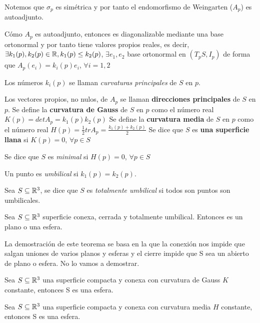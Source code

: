 Notemos que $\sigma_p$ es simétrica y por tanto el endomorfismo de Weingarten ($A_p$) es autoadjunto.

Cómo $A_p$ es autoadjunto, entonces es diagonalizable mediante una base ortonormal y por tanto tiene valores propios reales, es decir, $\exists k_1(p), k_2(p) \in \mathbb{R}, k_1(p) \leq k_2(p)$, $\exists {e_1,e_2}$ base ortonormal en $(T_pS, I_p)$ de forma que $A_p(e_i) = k_i(p)e_i$, $\forall i = 1,2$

\begin{definition}
Los números $k_i(p)$ se llaman \textit{curvaturas principales} de $S$ en $p$.
\end{definition}
Los vectores propios, no nulos, de $A_p$ se llaman \textbf{direcciones principales} de $S$ en $p$.
Se define la \textbf{curvatura de Gauss} de $S$ en $p$ como el número real $K(p)=det A_p=k_1(p)k_2(p)$
Se define la \textbf{curvatura media} de $S$ en $p$ como el número real $H(p)=\frac{1}{2}tr A_p=\frac{k_1(p)+k_2(p)}{2}$
Se dice que $S$ es \textbf{una superficie llana} si $K(p)=0$, $\forall p \in S$

\begin{definition}
Se dice que $S$ es \textit{minimal} si $H(p)=0$, $\forall p \in S$

Un punto es \textit{umbilical} si $k_1(p)=k_2(p)$.

Sea $S \subseteq \mathbb{R}^3$, se dice que $S$ es \textit{totalmente umbilical} si todos son puntos son umbilicales.
\end{definition}

\begin{theorem}
Sea $S \subseteq \mathbb{R}^3$ superficie conexa, cerrada y totalmente umbilical. Entonces es un plano o una esfera.
\end{theorem}

La demostración de este teorema se basa en la que la conexión nos impide que salgan uniones de varios planos y esferas y el cierre impide que S sea un abierto de plano o esfera. No lo vamos a demostrar.

\begin{theorem}
Sea $S \subseteq \mathbb{R}^3$ una superficie compacta y conexa con curvatura de Gauss $K$ constante, entonces S es una esfera.
\end{theorem}


\begin{theorem}
Sea $S \subseteq \mathbb{R}^3$ una superficie compacta y conexa con curvatura media $H$ constante, entonces S es una esfera.
\end{theorem}

